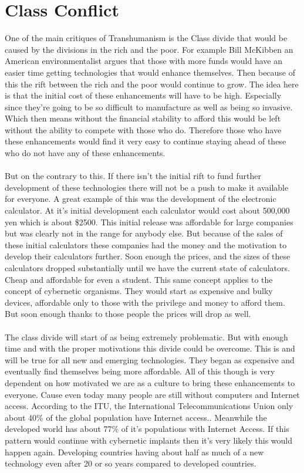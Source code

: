 \documentclass[12pt,a4paper,notitlepage]{article}
\begin{document}
\section{Class Conflict}
One of the main critiques of Transhumanism is the Class divide that would be
caused by the divisions in the rich and the poor. For example Bill McKibben an
American environmentalist argues that those with more funds would have an easier
time getting technologies that would enhance themselves. Then because of this
the rift between the rich and the poor would continue to grow. The idea here is
that the initial cost of these enhancements will have to be high. Especially
since they're going to be so difficult to manufacture as well as being so
invasive. Which then means without the financial stability to afford this would
be left without the ability to compete with those who do. Therefore those who
have these enhancements would find it very easy to continue staying ahead of
these who do not have any of these enhancements.
\\\\
But on the contrary to this. If there isn't the initial rift to fund further
development of these technologies there will not be a push to make it available
for everyone.  A great example of this was the development of the electronic
calculator. At it's initial development each calculator would cost about 500,000
yen which is about \$2500. This initial release was affordable for large
companies but was clearly not in the range for anybody else. But because of the
sales of these initial calculators these companies had the money and the
motivation to develop their calculators further. Soon enough the prices, and the
sizes of these calculators dropped substantially until we have the current state
of calculators. Cheap and affordable for even a student. This same concept
applies to the concept of cybernetic organisms. They would start as expensive
and bulky devices, affordable only to those with the privilege and money to
afford them.  But soon enough thanks to those people the prices will drop as
well.
\\\\
The class divide will start of as being extremely problematic. But with enough
time and with the proper motivations this divide could be overcome. This is and
will be true for all new and emerging technologies. They began as expensive and
eventually find themselves being more affordable. All of this though is very
dependent on how motivated we are as a culture to bring these enhancements to
everyone. Cause even today many people are still without computers and Internet
access. According to the ITU, the International Telecommunications Union only
about 40\% of the global population have Internet access.\cite{itu}. Meanwhile
the developed world has about 77\% of it's populations with Internet Access. If
this pattern would continue with cybernetic implants then it's very likely this
would happen again. Developing countries having about half as much of a new
technology even after 20 or so years compared to developed countries.
\\
\end{document}
